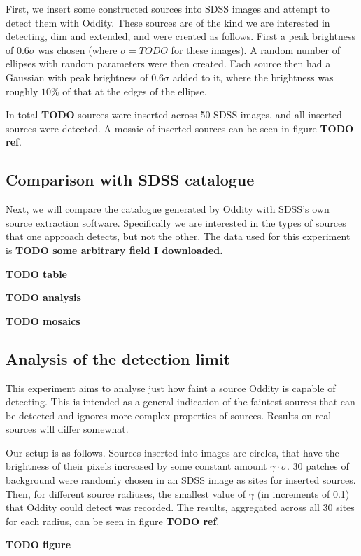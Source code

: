 \documentclass[manuscript]{aastex}
\newcommand{\TODO}[1]{\textbf{TODO #1}}
\begin{document}
First, we insert some constructed sources into SDSS images and attempt to detect them with Oddity. These sources are of the kind we are interested in detecting, dim and extended, and were created as follows. First a peak brightness of $0.6 \sigma$ was chosen (where $\sigma = TODO$ for these images). A random number of ellipses with random parameters were then created. Each source then had a Gaussian with peak brightness of $0.6\sigma$ added to it, where the brightness was roughly $10\%$ of that at the edges of the ellipse.

In total \TODO{} sources were inserted across 50 SDSS images, and all inserted sources were detected. A mosaic of inserted sources can be seen in figure \TODO{ref}.

\subsection{Comparison with SDSS catalogue}

Next, we will compare the catalogue generated by Oddity with SDSS's own source extraction software. Specifically we are interested in the types of sources that one approach detects, but not the other. The data used for this experiment is \TODO{some arbitrary field I downloaded.}

\TODO{table}

\TODO{analysis}

\TODO{mosaics}

\subsection{Analysis of the detection limit}

This experiment aims to analyse just how faint a source Oddity is capable of detecting. This is intended as a general indication of the faintest sources that can be detected and ignores more complex properties of sources. Results on real sources will differ somewhat.

Our setup is as follows. Sources inserted into images are circles, that have the brightness of their pixels increased by some constant amount $\gamma \cdot \sigma$. 30 patches of background were randomly chosen in an SDSS image as sites for inserted sources. Then, for different source radiuses, the smallest value of $\gamma$ (in increments of 0.1) that Oddity could detect was recorded. The results, aggregated across all 30 sites for each radius, can be seen in figure \TODO{ref}.

\TODO{figure}
\end{document}
